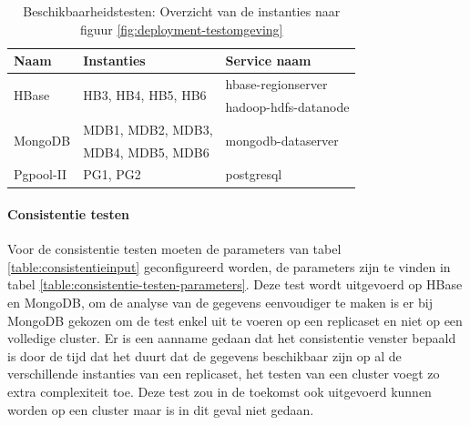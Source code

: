 \begin{table}[h!]
	\centering
	\begin{tabular}{l| l l }
		\textbf{Naam} & \textbf{Instanties} & \textbf{Service naam} \\
		\hline
		\multirow{2}{*}{HBase}  & \multirow{2}{*}{HB3, HB4, HB5, HB6} & hbase-regionserver \\
		& & hadoop-hdfs-datanode \\
		\multirow{2}{*}{MongoDB}  & MDB1, MDB2, MDB3, & \multirow{2}{*}{mongodb-dataserver}\\
		& MDB4, MDB5, MDB6 & \\
		Pgpool-II  & PG1, PG2 & postgresql \\
	\end{tabular}
	\caption{Beschikbaarheidstesten: Overzicht van de instanties naar figuur \ref{fig:deployment-testomgeving}}
	\label{table:beschikbaarheidstesten-nodes}
\end{table}

\paragraph{Consistentie testen} Voor de consistentie testen moeten de parameters van tabel \ref{table:consistentieinput} geconfigureerd worden, de parameters zijn te vinden in tabel \ref{table:consistentie-testen-parameters}. Deze test wordt uitgevoerd op HBase en MongoDB, om de analyse van de gegevens eenvoudiger te maken is er bij MongoDB gekozen om de test enkel uit te voeren op een replicaset en niet op een volledige cluster. Er is een aanname gedaan dat het consistentie venster bepaald is door de tijd dat het duurt dat de gegevens beschikbaar zijn op al de verschillende instanties van een replicaset, het testen van een cluster voegt zo extra complexiteit toe. Deze test zou in de toekomst ook uitgevoerd kunnen worden op een cluster maar is in dit geval niet gedaan.  

